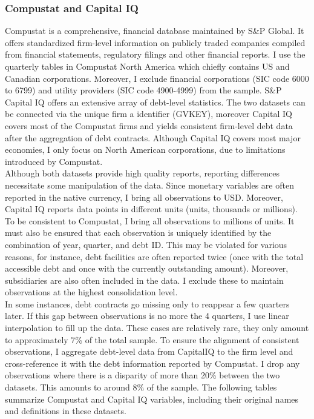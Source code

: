 \documentclass[12pt]{article}
\begin{document}
\subsubsection{Compustat and Capital IQ}
Compustat is a comprehensive, financial database maintained by S\&P Global. It offers standardized firm-level information on publicly traded companies compiled from financial statements, regulatory filings and other financial reports. I use the quarterly tables in Compustat North America which chiefly contains US and Canadian corporations. Moreover, I exclude financial corporations (SIC code 6000 to 6799) and utility providers (SIC code 4900-4999) from the sample. S\&P Capital IQ offers an extensive array of debt-level statistics. The two datasets can be connected via the unique firm a identifier (GVKEY), moreover Capital IQ covers most of the Compustat firms and yields consistent firm-level debt data after the aggregation of debt contracts. Although Capital IQ covers most major economies, I only focus on North American corporations, due to limitations introduced by Compustat.  \vspace{3mm} \\
Although both datasets provide high quality reports, reporting differences necessitate some manipulation of the data. Since monetary variables are often reported in the native currency, I bring all observations to USD. Moreover, Capital IQ reports data points in different units (units, thousands or millions). To be consistent to Compustat, I bring all observations to millions of units. It must also be ensured that each observation is uniquely identified by the combination of year, quarter, and debt ID. This may be violated for various reasons, for instance, debt facilities are often reported twice (once with the total accessible debt and once with the currently outstanding amount). Moreover, subsidiaries are also often included in the data. I exclude these to maintain observations at the highest consolidation level. \vspace{3mm} \\
In some instances, debt contracts go missing only to reappear a few quarters later. If this gap between observations is no more the 4 quarters, I use linear interpolation to fill up the data. These cases are relatively rare, they only amount to approximately 7\% of the total sample. To ensure the alignment of consistent observations, I aggregate debt-level data from CapitalIQ to the firm level and cross-reference it with the debt information reported by Compustat. I drop any observations where there is a disparity of more than 20\% between the two datasets. This amounts to around 8\% of the sample. The following tables summarize Compustat and Capital IQ variables, including their original names and definitions in these datasets.
\end{document}

